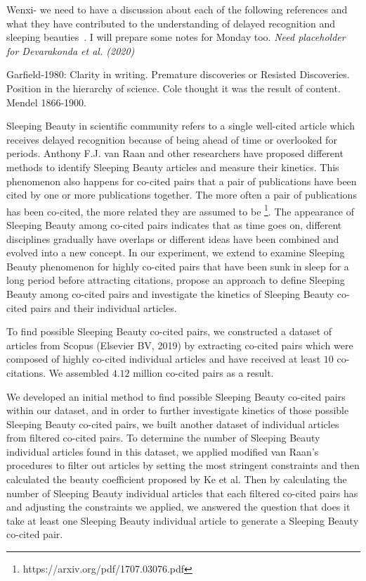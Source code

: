 \documentclass[utf8]{frontiersSCNS}
\begin{document}
Wenxi- we need to have a discussion about each of the following references and what they have contributed to the understanding of delayed recognition and sleeping beauties~\citep{Garfield1980,vanRaan1990,Glanzel2003,Glanzel2004,Raan2004,Wang2013,Li2014,Ke2015,Li2016,Song2018,Raan2019}. I will prepare some notes for Monday too. \emph{Need placeholder for Devarakonda et al. (2020)}

Garfield-1980: Clarity in writing. Premature discoveries or Resisted Discoveries. Position in the hierarchy of science. Cole thought it was the result of content. Mendel 1866-1900.

Sleeping Beauty in scientific community refers to a single well-cited article which receives delayed recognition because of being ahead of time or overlooked for periods. Anthony F.J. van Raan and other researchers have proposed different methods to identify Sleeping Beauty articles and measure their kinetics. This phenomenon also happens for co-cited pairs that a pair of publications have been cited by one or more publications together. The more often a pair of publications has been co-cited, the more related they are assumed to be \footnote{https://arxiv.org/pdf/1707.03076.pdf}. The appearance of Sleeping Beauty among co-cited pairs indicates that as time goes on, different disciplines gradually have overlaps or different ideas have been combined and evolved into a new concept. In our experiment, we extend to examine Sleeping Beauty phenomenon for highly co-cited pairs that have been sunk in sleep for a long period before attracting citations, propose an approach to define Sleeping Beauty among co-cited pairs and investigate the kinetics of Sleeping Beauty co-cited pairs and their individual articles. 

To find possible Sleeping Beauty co-cited pairs, we constructed a dataset of articles from Scopus (Elsevier BV, 2019) by extracting co-cited pairs which were composed of highly co-cited individual articles and have received at least $10$ co-citations. We assembled $4.12$ million co-cited pairs as a result.

We developed an initial method to find possible Sleeping Beauty co-cited pairs within our dataset, and in order to further investigate kinetics of those possible Sleeping Beauty co-cited pairs, we built another dataset of individual articles from filtered co-cited pairs. To determine the number of Sleeping Beauty individual articles found in this dataset, we applied modified van Raan's procedures to filter out articles by setting the most stringent constraints and then calculated the beauty coefficient proposed by Ke et al. Then by calculating the number of Sleeping Beauty individual articles that each filtered co-cited pairs has and adjusting the constraints we applied, we answered the question that does it take at least one Sleeping Beauty individual article to generate a Sleeping Beauty co-cited pair. 
\end{document}
